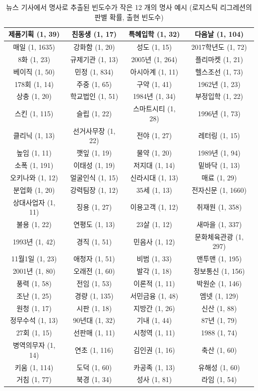 \documentclass[11pt]{article}
\begin{document}
\begin{table}[H]
  \centering
  \caption{뉴스 기사에서 명사로 추출된 빈도수가 작은 12 개의 명사 예시 (로지스틱 리그레션의 판별 확률, 출현 빈도수)}
  \label{tab:news_infrequent_top100}
    \begin{tabular}{|c|c|c|c|}
\hline
제품기획 (1, 39) & 친동생 (1, 17) & 특혜입학 (1, 32) & 다음날 (1, 104) \\ \hline
매일 (1, 1635) & 강화함 (1, 20) & 성도 (1, 15) & 2017학년도 (1, 72) \\ \hline
8화 (1, 23) & 규제기관 (1, 13) & 2005년 (1, 264) & 플리마켓 (1, 21) \\ \hline
베이직 (1, 50) & 민정 (1, 834) & 아시아계 (1, 11) & 헬스조선 (1, 73) \\ \hline
178회 (1, 14) & 주중 (1, 65) & 구약 (1, 41) & 1962년 (1, 23) \\ \hline
상충 (1, 20) & 학교법인 (1, 51) & 1984년 (1, 34) & 부정입학 (1, 22) \\ \hline
스킨 (1, 115) & 슬립 (1, 22) & 스마트시티 (1, 28) & 1996년 (1, 73) \\ \hline
클리닉 (1, 13) & 선거사무장 (1, 22) & 전야 (1, 27) & 레터링 (1, 15) \\ \hline
높임 (1, 11) & 깻잎 (1, 19) & 물약 (1, 20) & 1989년 (1, 94) \\ \hline
소폭 (1, 191) & 이태성 (1, 19) & 저지대 (1, 14) & 밑바닥 (1, 13) \\ \hline
오키나와 (1, 12) & 얼굴인식 (1, 15) & 신라시대 (1, 13) & 매료 (1, 29) \\ \hline
분업화 (1, 20) & 강력팀장 (1, 12) & 35세 (1, 13) & 전자신문 (1, 1660) \\ \hline
상대사업자 (1, 11) & 징용 (1, 27) & 이용고객 (1, 12) & 취재원 (1, 358) \\ \hline
불용 (1, 22) & 연평도 (1, 13) & 23살 (1, 12) & 새마을 (1, 337) \\ \hline
1993년 (1, 42) & 경직 (1, 51) & 민음사 (1, 12) & 문화체육관광 (1, 297) \\ \hline
11월1일 (1, 23) & 애청자 (1, 51) & 비범 (1, 33) & 맨투맨 (1, 195) \\ \hline
2001년 (1, 80) & 오래전 (1, 60) & 발각 (1, 18) & 정보통신 (1, 156) \\ \hline
풍력 (1, 58) & 전임 (1, 53) & 이론적 (1, 11) & 박원순 (1, 146) \\ \hline
조난 (1, 25) & 경량 (1, 135) & 서민금융 (1, 48) & 엠넷 (1, 129) \\ \hline
원청 (1, 17) & 시판 (1, 18) & 지방간 (1, 26) & 신산 (1, 88) \\ \hline
정무수석 (1, 13) & 90년대 (1, 32) & 기내 (1, 44) & 87년 (1, 79) \\ \hline
27회 (1, 15) & 선판매 (1, 11) & 시청역 (1, 11) & 1988 (1, 74) \\ \hline
병역의무자 (1, 14) & 연초 (1, 116) & 김인권 (1, 16) & 축산 (1, 60) \\ \hline
키움 (1, 114) & 도덕 (1, 60) & 카공족 (1, 13) & 유해성 (1, 60) \\ \hline
거침 (1, 77) & 북경 (1, 34) & 성사 (1, 81) & 라임 (1, 54) \\ \hline
    \end{tabular}%
\end{table}
\end{document}
